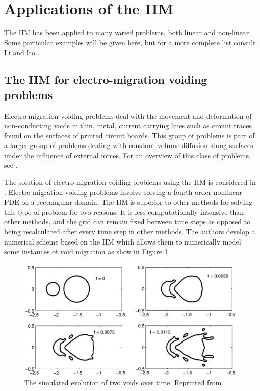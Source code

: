 \section{Applications of the IIM}
The IIM has been applied to many varied problems, both linear and non-linear. Some particular examples will be given here, but for a more complete list consult Li and Ito \cite{liito06}.

\subsection{The IIM for electro-migration voiding problems}
Electro-migration voiding problems deal with the movement and deformation of non-conducting voids in thin, metal, current carrying lines such as circuit traces found on the surfaces of printed circuit boards.
This group of problems is part of a larger group of problems dealing with constant volume diffusion along surfaces under the influence of external forces.
For an overview of this class of problems, see \cite{cahntaylor94}.

The solution of electro-migration voiding problems using the IIM is considered in \cite{lizhaogao99}.
Electro-migration voiding problems involve solving a fourth order nonlinear PDE on a rectangular domain.
The IIM is superior to other methods for solving this type of problem for two reasons.
It is less computationally intensive than other methods, and the grid can remain fixed between time steps as opposed to being recalculated after every time step in other methods.
The authors develop a numerical scheme based on the IIM which allows them to numerically model some instances of void migration as show in Figure \ref{EMVDiagram}.

\begin{figure}[h!]
    \centering
    \includegraphics{diagrams/EMVDiagram.png}
    \caption{The simulated evolution of two voids over time. Reprinted from \cite{lizhaogao99}.}
    \label{EMVDiagram}
\end{figure}

